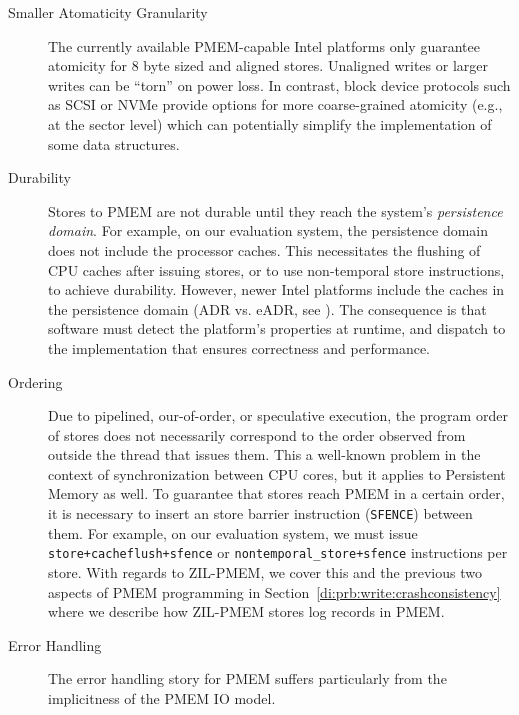 \documentclass[12pt,a4paper,twoside]{book}
\begin{document}
\begin{description}
    \item[Smaller Atomaticity Granularity] The currently available PMEM-capable Intel platforms only guarantee atomicity for 8 byte sized and aligned stores.
        Unaligned writes or larger writes can be ``torn'' on power loss.
        In contrast, block device protocols such as SCSI or NVMe provide options for more coarse-grained atomicity (e.g., at the sector level) which can potentially simplify the implementation of some data structures.
        \cite{rudoffPersistentMemoryProgramming2017,AreDiskSectorWritesAtomic}

    \item[Durability] Stores to PMEM are not durable until they reach the system's \textit{persistence domain}.
        For example, on our evaluation system, the persistence domain does not include the processor caches.
        This necessitates the flushing of CPU caches after issuing stores, or to use non-temporal store instructions, to achieve durability.
        However, newer Intel platforms include the caches in the persistence domain (ADR vs. eADR, see \cite{EADRNewOpportunities}).
        The consequence is that software must detect the platform's properties at runtime, and dispatch to the implementation that ensures correctness and performance.
        \cite{rudoffPersistentMemoryProgramming2017}

    \item[Ordering] Due to pipelined, our-of-order, or speculative execution, the program order of stores does not necessarily correspond to the order observed from outside the thread that issues them.
        This a well-known problem in the context of synchronization between CPU cores, but it applies to Persistent Memory as well.
        To guarantee that stores reach PMEM in a certain order, it is necessary to insert an store barrier instruction (\lstinline{SFENCE}) between them.
        For example, on our evaluation system, we must issue \lstinline{store+cacheflush+sfence} or \lstinline{nontemporal_store+sfence} instructions per store.
        With regards to ZIL-PMEM, we cover this and the previous two aspects of PMEM programming in Section~\ref{di:prb:write:crashconsistency} where we describe how ZIL-PMEM stores log records in PMEM.
        \cite{rudoffPersistentMemoryProgramming2017}

    \item[Error Handling] The error handling story for PMEM suffers particularly from the implicitness of the PMEM IO model.


\end{description}
\end{document}
